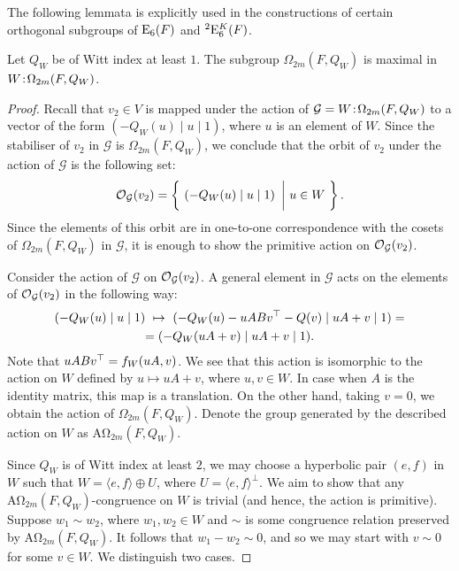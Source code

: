 The following lemmata is explicitly used in the constructions of certain orthogonal subgroups
of $\mathord{\mathrm{E}}_6(F)$ and ${}^2\mathord{\mathrm{E}}_6^K(F)$. 

\begin{theorem}
	\label{theorem:A_omega_maximal}
	Let $Q_W$ be of Witt index at least $1$. The subgroup $\Omega_{2m}(F,Q_W)$ is maximal
	in $W\mathord{{\;\!{:}\;\!}}\Omega_{2m}(F,Q_W)$.
\end{theorem}

\begin{proof}
	Recall that $v_2 \in V$ is mapped under the action of 
    $\mathcal{G} = W\mathord{{\;\!{:}\;\!}}\Omega_{2m}(F,Q_W)$ to a vector of the
    form $(-Q_W(u) \mid u \mid 1)$, where $u$ is an element of $W$. 
    Since the stabiliser of $v_2$ in $\mathcal{G}$ is $\Omega_{2m}(F,Q_W)$, 
    we conclude that 
    the orbit of $v_2$ under the action of $\mathcal{G}$ is the following set:
    \begin{equation*}
	\operatorname{\mathcal{O}}_{\mathcal{G}}(v_2) = \left\{\  \left( -Q_W(u) \mid  u \mid 1
	 \right)\ \bigg|\ u \in W \ \right\}.
    \end{equation*}
    Since the elements of this orbit are in one-to-one correspondence with the
    cosets of $\Omega_{2m}(F,Q_W)$ in $\mathcal{G}$, 
    it is enough to show the primitive
    action on $\operatorname{\mathcal{O}}_{\mathcal{G}}(v_2)$. 
    
    Consider the action of $\mathcal{G}$ on 
    $\operatorname{\mathcal{O}}_{\mathcal{G}}(v_2)$. A general element in $\mathcal{G}$ 
    acts on the elements of $\operatorname{\mathcal{O}}_{\mathcal{G}}(v_2)$ in the following way:
    \begin{multline*}
	( -Q_W(u) \mid  u \mid 1 ) \ \mapsto \ 
	( -Q_W(u) - uABv^\T - Q(v) \mid
	    uA + v \mid 1) = \\
	    = (-Q_W(uA + v) \mid uA + v \mid 1).
    \end{multline*}
    Note that $uABv^\top = f_W( uA, v )$. 
    We see that this action is isomorphic to the action on $W$ defined by
	$u \mapsto uA + v$,
    where $u,v \in W$. In case when $A$ is the identity matrix, this map
    is a translation. On the other hand, taking $v = 0$, we obtain the
    action of $\Omega_{2m}(F,Q_W)$. 
    Denote the group generated by the described action on $W$ as
    $\mathrm{A\Omega}_{2m}(F,Q_W)$.
    
    Since $Q_W$ is of Witt index at least $2$, we may choose a hyperbolic pair 
    $(e,f)$ in $W$ such that $W = \langle e, f \rangle \oplus U$, where 
    $U = \langle e, f \rangle^{\perp}$. We aim to show that any 
    $\mathrm{A\Omega}_{2m}(F,Q_W)$-congruence on $W$ is trivial (and hence, the 
    action is primitive). Suppose $w_1 \sim w_2$, where $w_1,w_2 \in W$ and 
    $\sim$ is some congruence relation preserved by $\mathrm{A\Omega}_{2m}(F,Q_W)$.
    It follows that $w_1 - w_2 \sim 0$, and so we may start with $v \sim 0$ for some
    $v \in W$. We distinguish two cases.
    

\end{proof}
